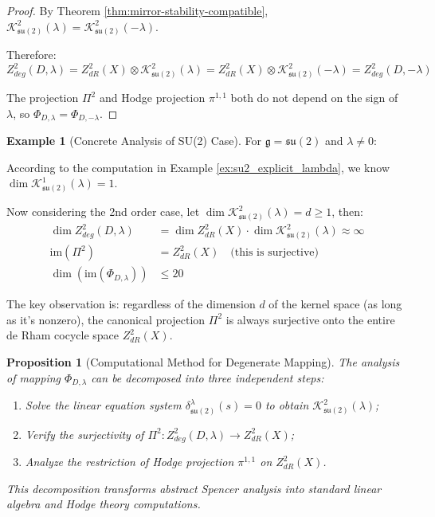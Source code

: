 \documentclass[a4paper,12pt]{extarticle}
\theoremstyle{plain}
\newtheorem{proposition}[theorem]{Proposition}
\theoremstyle{definition}
\newtheorem{example}{Example}[section]
\begin{document}
\begin{proof}
By Theorem \ref{thm:mirror-stability-compatible}, $\mathcal{K}_{\mathfrak{su}(2)}^2(\lambda) = \mathcal{K}_{\mathfrak{su}(2)}^2(-\lambda)$.

Therefore:
$$Z_{deg}^2(D,\lambda) = Z^2_{dR}(X) \otimes \mathcal{K}_{\mathfrak{su}(2)}^2(\lambda) = Z^2_{dR}(X) \otimes \mathcal{K}_{\mathfrak{su}(2)}^2(-\lambda) = Z_{deg}^2(D,-\lambda)$$

The projection $\Pi^2$ and Hodge projection $\pi^{1,1}$ both do not depend on the sign of $\lambda$, so $\Phi_{D,\lambda} = \Phi_{D,-\lambda}$.
\end{proof}

\begin{example}[Concrete Analysis of SU(2) Case]
\label{ex:su2_concrete_analysis}
For $\mathfrak{g} = \mathfrak{su}(2)$ and $\lambda \neq 0$:

According to the computation in Example \ref{ex:su2_explicit_lambda}, we know $\dim \mathcal{K}_{\mathfrak{su}(2)}^1(\lambda) = 1$.

Now considering the 2nd order case, let $\dim \mathcal{K}_{\mathfrak{su}(2)}^2(\lambda) = d \geq 1$, then:
\begin{align}
\dim Z_{deg}^2(D,\lambda) &= \dim Z^2_{dR}(X) \cdot \dim \mathcal{K}_{\mathfrak{su}(2)}^2(\lambda) \approx \infty \\
\text{im}(\Pi^2) &= Z^2_{dR}(X) \quad \text{(this is surjective)} \\
\dim(\text{im}(\Phi_{D,\lambda})) &\leq 20
\end{align}

The key observation is: regardless of the dimension $d$ of the kernel space (as long as it's nonzero), the canonical projection $\Pi^2$ is always surjective onto the entire de Rham cocycle space $Z^2_{dR}(X)$.
\end{example}

\begin{proposition}[Computational Method for Degenerate Mapping]
\label{prop:computational_method}
The analysis of mapping $\Phi_{D,\lambda}$ can be decomposed into three independent steps:
\begin{enumerate}
    \item Solve the linear equation system $\delta_{\mathfrak{su}(2)}^{\lambda}(s) = 0$ to obtain $\mathcal{K}_{\mathfrak{su}(2)}^2(\lambda)$;
    \item Verify the surjectivity of $\Pi^2: Z_{deg}^2(D,\lambda) \to Z^2_{dR}(X)$;
    \item Analyze the restriction of Hodge projection $\pi^{1,1}$ on $Z^2_{dR}(X)$.
\end{enumerate}
This decomposition transforms abstract Spencer analysis into standard linear algebra and Hodge theory computations.
\end{proposition}
\end{document}
